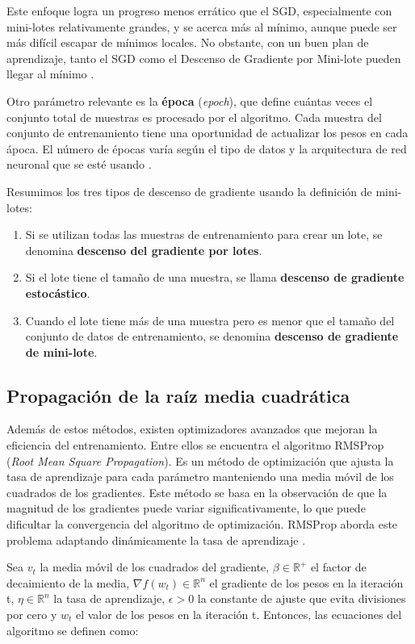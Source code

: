 Este enfoque logra un progreso menos errático que el SGD, especialmente con mini-lotes relativamente grandes, y se acerca más al mínimo, aunque puede ser más difícil escapar de mínimos locales. No obstante, con un buen plan de aprendizaje, tanto el SGD como el Descenso de Gradiente por Mini-lote pueden llegar al mínimo \citep{geron2022hands}.

Otro parámetro relevante es la \textbf{época} (\textit{epoch}), que define cuántas veces el conjunto total de muestras es procesado por el algoritmo. Cada muestra del conjunto de entrenamiento tiene una oportunidad de actualizar los pesos en cada ápoca. El número de épocas varía según el tipo de datos y la arquitectura de red neuronal que se esté usando \citep{pajares2021aprendizaje}.

Resumimos los tres tipos de descenso de gradiente usando la definición de mini-lotes:
\begin{enumerate}
\item Si se utilizan todas las muestras de entrenamiento para crear un lote, se denomina \textbf{descenso del gradiente por lotes}. 
\item Si el lote tiene el tamaño de una muestra, se llama \textbf{descenso de gradiente estocástico}. 
\item Cuando el lote tiene más de una muestra pero es menor que el tamaño del conjunto de datos de entrenamiento, se denomina \textbf{descenso de gradiente de mini-lote}. 
\end{enumerate}



\subsection{Propagación de la raíz media cuadrática}

Además de estos métodos, existen optimizadores avanzados que mejoran la eficiencia del entrenamiento. Entre ellos se encuentra el algoritmo RMSProp (\textit{Root Mean Square Propagation}). Es un método de optimización que ajusta la tasa de aprendizaje para cada parámetro manteniendo una media móvil de los cuadrados de los gradientes. Este método se basa en la observación de que la magnitud de los gradientes puede variar significativamente, lo que puede dificultar la convergencia del algoritmo de optimización. RMSProp aborda este problema adaptando dinámicamente la tasa de aprendizaje \citep{pajares2021aprendizaje}. 

Sea $v_t$ la media móvil de los cuadrados del gradiente, $\beta \in \mathbb{R}^+$ el factor de decaimiento de la media, $\nabla f(w_t) \in \mathbb{R}^n$ el gradiente de los pesos en la iteración t, $\eta \in \mathbb{R}^n$ la tasa de aprendizaje, $\epsilon > 0$ la constante de ajuste que evita divisiones por cero y $w_t$ el valor de los pesos en la iteración t. Entonces, las ecuaciones del algoritmo se definen como:

